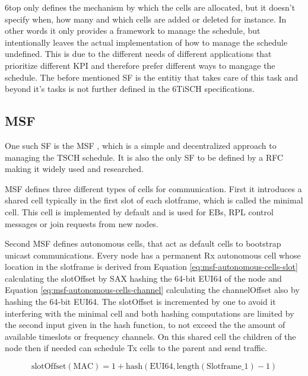 \documentclass{comnets-thesis}
\begin{document}
\ac{6top} only defines the mechanism by which the cells are allocated, but it doesn't specify when, how many and which cells are added or deleted for instance. In other words it only provides a framework to manage the schedule, but intentionally leaves the actual implementation of how to manage the schedule undefined. This is due to the different needs of different applications that prioritize different \ac{KPI} and therefore prefer different ways to mangage the schedule. The before mentioned \ac{SF} is the entitiy that takes care of this task and beyond it's tasks is not further defined in the \ac{6TiSCH} specifications.



\subsection{\acf{MSF}}
One such \ac{SF} is the \acf{MSF} \cite{RFC9033ForMSF}, which is a simple and decentralized approach to managing the \ac{TSCH} schedule. It is also the only \ac{SF} to be defined by a RFC making it widely used and researched. 

\ac{MSF} defines three different types of cells for communication.
First it introduces a shared cell typically in the first slot of each slotframe, which is called the minimal cell. This cell is implemented by default and is used for \acp{EB}, \ac{RPL} control messages or join requests from new nodes. 

Second MSF defines autonomous cells, that act as default cells to bootstrap unicast communications. Every node has a permanent Rx autonomous cell whose location in the slotframe is derived from Equation \ref{eq:msf-autonomous-cells-slot} calculating the slotOffset by \ac{SAX} hashing \cite{SAXHashing} the 64-bit \ac{EUI64} of the node and Equation \ref{eq:msf-autonomous-cells-channel} calculating the channelOffset also by hashing the 64-bit \ac{EUI64}. The slotOffset is incremented by one to avoid it interfering with the minimal cell and both hashing computations are limited by the second input given in the hash function, to not exceed the the amount of available timeslots or frequency channels. On this shared cell the children of the node then if needed can schedule Tx cells to the parent and send traffic.

\begin{equation}
    \text{slotOffset}(\text{MAC}) = 1 + \text{hash}(\text{EUI64}, \text{length}(\text{Slotframe\_1}) - 1)
    \label{eq:msf-autonomous-cells-slot}
\end{equation}
\end{document}
